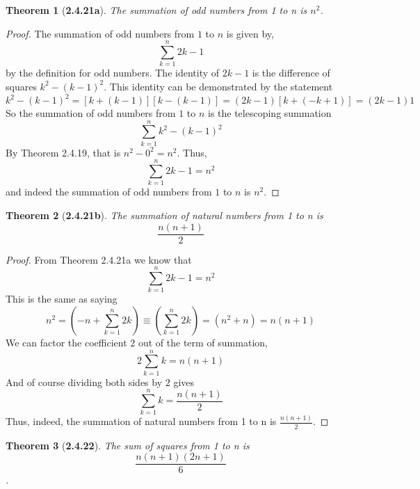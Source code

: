 \documentclass[a4paper, 12pt]{article}
\theoremstyle{plain}
\newtheorem*{theorem*}{Theorem}
\begin{document}
\pagebreak


\begin{theorem*}[\textbf{2.4.21a}]
    The summation of odd numbers from 1 to n is $n^{2}$.
\end{theorem*}

\begin{proof}
    The summation of odd numbers from $1$ to $n$ is given by, $$\sum_{k=1}^{n} 2k - 1$$
    by the
    definition for odd numbers. The identity of $2k - 1$ is the difference of squares 
    $k^2 - (k-1)^2$. This identity can be demonstrated by the statement 
    $$k^2 - (k-1)^2 = [k + (k-1)][k - (k-1)] = (2k - 1)[k + (-k + 1)] = (2k-1)1$$ 
    So the summation of odd numbers from $1$ to $n$ is the telescoping summation
    $$\sum_{k=1}^{n} k^2 - (k-1)^2$$
    By Theorem 2.4.19, that is $n^2 - 0^2 = n^2$. Thus, 
    $$\sum_{k=1}^{n} 2k - 1 = n^2$$ 
    and indeed the summation of odd numbers from $1$ to $n$ is $n^2$.
\end{proof}

\pagebreak


\begin{theorem*}[\textbf{2.4.21b}]
    The summation of natural numbers from 1 to n is $$\frac{n(n+1)}{2}$$
\end{theorem*}

\begin{proof}
    From Theorem 2.4.21a we know that $$\sum_{k=1}^{n} 2k - 1 = n^{2}$$
    This is the same as saying 
    $$n^{2} = \left(-n + \sum_{k=1}^{n} 2k \right) \equiv \left(\sum_{k=1}^{n} 2k \right) = (n^{2} + n) = n(n + 1)$$ 
    We can factor the coefficient $2$ out of the term of summation, 
    $$2 \sum_{k=1}^{n} k = n(n+1)$$
    And of course dividing both sides by $2$ gives 
    $$\sum_{k=1}^{n} k = \frac{n(n+1)}{2}$$ 
    Thus, indeed, the summation of natural numbers 
    from 1 to n is $\frac{n(n+1)}{2}$.
\end{proof}

\pagebreak


\begin{theorem*}[\textbf{2.4.22}]
    The sum of squares from 1 to n is $$\frac{n(n+1)(2n+1)}{6}$$.
\end{theorem*}
\end{document}

